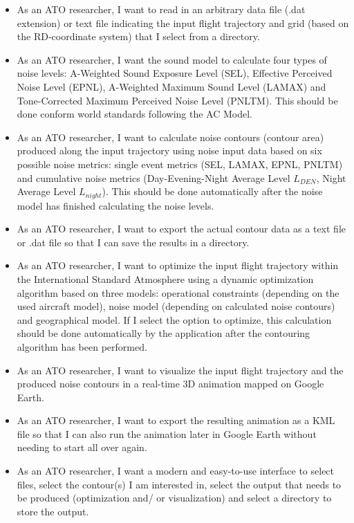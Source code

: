 \documentclass[a4paper,english,fleqn]{exam}
\begin{document}
\begin{itemize}
\item As an ATO researcher, I want to read in an arbitrary data file (.dat extension) or text file indicating the input flight trajectory and grid (based on the RD-coordinate system) that I select from a directory.
\item As an ATO researcher, I want the sound model to calculate four types of noise levels: A-Weighted Sound Exposure Level (SEL), Effective Perceived Noise Level (EPNL), A-Weighted Maximum Sound Level (LAMAX) and Tone-Corrected Maximum Perceived Noise Level (PNLTM). This should be done conform world standards following the AC Model.
\item As an ATO researcher, I want to calculate noise contours (contour area) produced along the input trajectory using noise input data based on six possible noise metrics: single event metrics (SEL, LAMAX, EPNL, PNLTM) and cumulative noise metrics (Day-Evening-Night Average Level $L_{DEN}$, Night Average Level $L_{night}$). This should be done automatically after the noise model has finished calculating the noise levels.
\item As an ATO researcher, I want to export the actual contour data as a text file or .dat file so that I can save the results in a directory. 
\item As an ATO researcher, I want to optimize the input flight trajectory within the International Standard Atmosphere using a dynamic optimization algorithm based on three models: operational constraints (depending on the used aircraft model), noise model (depending on calculated noise contours) and geographical model. If I select the option to optimize, this calculation should be done automatically by the application after the contouring algorithm has been performed.
\item As an ATO researcher, I want to visualize the input flight trajectory and the produced noise contours in a real-time 3D animation mapped on Google Earth.
\item As an ATO researcher, I want to export the resulting animation as a KML file so that I can also run the animation later in Google Earth without needing to start all over again.
\item As an ATO researcher, I want a modern and easy-to-use interface to select files, select the contour(s) I am interested in, select the output that needs to be produced (optimization and/ or visualization) and select a directory to store the output.
\end{itemize}
\end{document}
